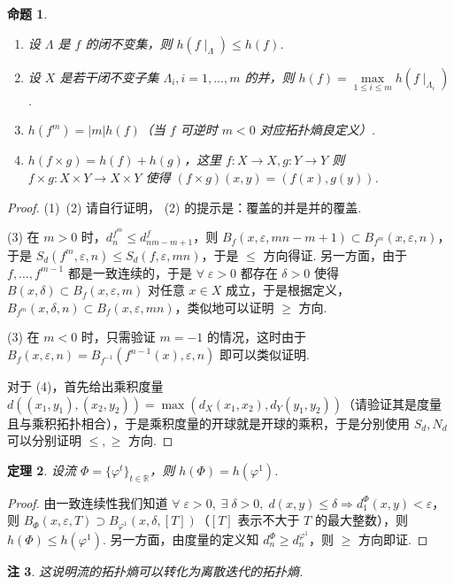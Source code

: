 \documentclass[11pt, a4paper, oneside]{ctexart}
\newtheorem{theorem}{定理}[section]
\newtheorem{proposition}[theorem]{命题}
\newtheorem{remark}[theorem]{注}
\newcommand{\R}{\mathbb{R}}
\newcommand{\abs}[1]{\left|{#1}\right|}
\begin{document}
    \begin{proposition}
        \begin{enumerate}[(1)]
            \item 设 $\Lambda$ 是 $f$ 的闭不变集，则 $h(f\mid_{\Lambda})\leq h(f)$.
            \item 设 $X$ 是若干闭不变子集 $\Lambda_i,i=1,\ldots,m$ 的并，则 $h(f)=\max\limits_{1\leq i\leq m}h(f\mid_{\Lambda_i})$.
            \item $h(f^m)=\abs{m}h(f)$（当 $f$ 可逆时 $m<0$ 对应拓扑熵良定义）.
            \item $h(f\times g)=h(f)+h(g)$，这里 $f:X\to X,g:Y\to Y$ 则 $f\times g:X\times Y\to X\times Y$ 使得 $(f\times g)(x,y)=(f(x),g(y))$.
        \end{enumerate}
    \end{proposition}
    \begin{proof}
        (1)\ (2) 请自行证明， (2) 的提示是：覆盖的并是并的覆盖.

        (3) 在 $m>0$ 时，$d_n^{f^m}\leq d_{nm-m+1}^f$，则 $B_f(x,\varepsilon,mn-m+1)\subset B_{f^m}(x,\varepsilon,n)$，于是 $S_d(f^m,\varepsilon,n)\leq S_d(f,\varepsilon,mn)$，于是 $\leq$ 方向得证. 另一方面，由于 $f,\ldots,f^{m-1}$ 都是一致连续的，于是 $\forall\; \varepsilon>0$ 都存在 $\delta>0$ 使得 $B(x,\delta)\subset B_f(x,\varepsilon,m)$ 对任意 $x\in X$ 成立，于是根据定义，$B_{f^m}(x,\delta,n)\subset B_f(x,\varepsilon,mn)$，类似地可以证明 $\geq$ 方向.

        (3) 在 $m<0$ 时，只需验证 $m=-1$ 的情况，这时由于 $B_f(x,\varepsilon,n)=B_{f^{-1}}(f^{n-1}(x),\varepsilon,n)$ 即可以类似证明.

        对于 (4)，首先给出乘积度量 $d((x_1,y_1),(x_2,y_2))=\max(d_X(x_1,x_2),d_Y(y_1,y_2))$（请验证其是度量且与乘积拓扑相合），于是乘积度量的开球就是开球的乘积，于是分别使用 $S_d,N_d$ 可以分别证明 $\leq,\geq$ 方向.
    \end{proof}

    \begin{theorem}
        设流 $\Phi={\{\varphi^t\}}_{t\in\R}$，则 $h(\Phi)=h(\varphi^1)$.
    \end{theorem}
    \begin{proof}
        由一致连续性我们知道 $\forall\;\varepsilon>0,\; \exists\;\delta>0,\; d(x,y)\leq\delta\Rightarrow d_1^{\Phi}(x,y)<\varepsilon$，则 $B_{\Phi}(x,\varepsilon,T)\supset B_{\varphi^1}(x,\delta,[T])$（$[T]$ 表示不大于 $T$ 的最大整数），则 $h(\Phi)\leq h(\varphi^1)$. 另一方面，由度量的定义知 $d_n^{\Phi}\geq d_n^{\varphi^1}$，则 $\geq$ 方向即证.
    \end{proof}
    \begin{remark}
        这说明流的拓扑熵可以转化为离散迭代的拓扑熵.
    \end{remark}
\end{document}
